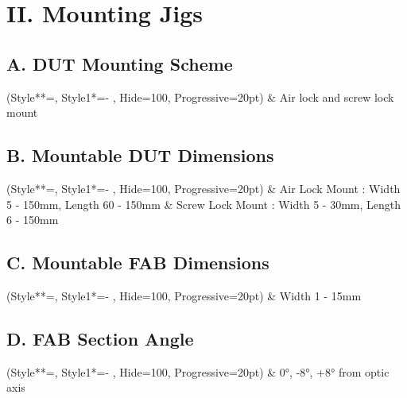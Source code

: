 \section{II. Mounting Jigs}


\subsection{A. DUT Mounting Scheme}
\begin{easylist}
\ListProperties(Style**=\sffamily, Style1*={- } , Hide=100, Progressive=20pt)
& Air lock and screw lock mount
\end{easylist}


\subsection{B. Mountable DUT Dimensions}
\begin{easylist}
\ListProperties(Style**=\sffamily, Style1*={- } , Hide=100, Progressive=20pt)
& Air Lock Mount : Width 5 - 150mm, Length 60 - 150mm
& Screw Lock Mount : Width 5 - 30mm, Length 6 - 150mm
\end{easylist}



\subsection{C. Mountable FAB Dimensions}
\begin{easylist}
\ListProperties(Style**=\sffamily, Style1*={- } , Hide=100, Progressive=20pt)
& Width 1 - 15mm
\end{easylist}




\subsection{D.  FAB Section Angle }
\begin{easylist}
\ListProperties(Style**=\sffamily, Style1*={- } , Hide=100, Progressive=20pt)
& 0°, -8°, +8° from optic axis
\end{easylist}

